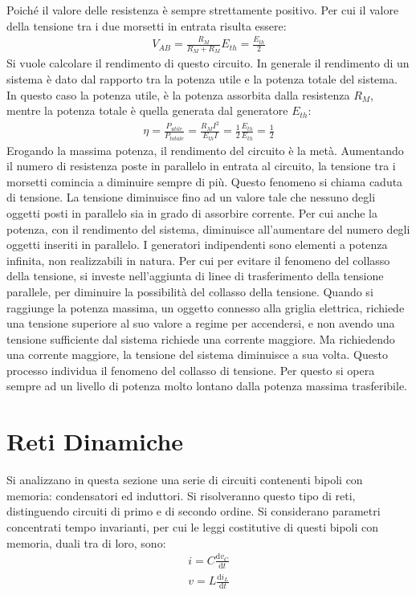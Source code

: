 \documentclass{article}
\newcommand{\df}{\mathrm{d}}
\numberwithin{equation}{subsection}
\begin{document}
Poiché il valore delle resistenza è sempre strettamente positivo. Per cui il valore della tensione tra i due morsetti in entrata risulta essere:
\begin{gather*}
    V_{AB}=\displaystyle\frac{R_M}{R_M+R_M}E_{th}=\frac{E_{th}}{2}
\end{gather*}
Si vuole calcolare il rendimento di questo circuito. In generale il rendimento di un sistema è dato dal rapporto tra la potenza utile e la potenza totale del sistema. In questo 
caso la potenza utile, è la potenza assorbita dalla resistenza $R_M$, mentre la potenza totale è quella generata dal generatore $E_{th}$:
\begin{gather*}
    \eta=\displaystyle\frac{P_{utile}}{P_{totale}}=\frac{R_{M}I^2}{E_{th}I}=\frac{1}{2}\frac{E_{th}}{E_{th}}=\frac{1}{2}
\end{gather*}
Erogando la massima potenza, il rendimento del circuito è la metà. Aumentando il numero di resistenza poste in parallelo in entrata al circuito, la tensione tra i morsetti 
comincia a diminuire sempre di più. Questo fenomeno si chiama caduta di tensione. La tensione diminuisce fino ad un valore tale che nessuno degli oggetti posti in parallelo 
sia in grado di assorbire corrente. Per cui anche la potenza, con il rendimento del sistema, diminuisce all'aumentare del numero degli oggetti inseriti in parallelo. I 
generatori indipendenti sono elementi a potenza infinita, non realizzabili in natura. Per cui per evitare il fenomeno del collasso della tensione, si investe nell'aggiunta di 
linee di trasferimento della tensione parallele, per diminuire la possibilità del collasso della tensione. Quando si raggiunge la potenza massima, un oggetto connesso alla 
griglia elettrica, richiede una tensione superiore al suo valore a regime per accendersi, e non avendo una tensione sufficiente dal sistema richiede una corrente maggiore. 
Ma richiedendo una corrente maggiore, la tensione del sistema diminuisce a sua volta. Questo processo individua il fenomeno del collasso di tensione. Per questo si opera 
sempre ad un livello di potenza molto lontano dalla potenza massima trasferibile. 

\clearpage 

\section{Reti Dinamiche}

Si analizzano in questa sezione una serie di circuiti contenenti bipoli con memoria: condensatori ed induttori. Si risolveranno questo tipo di reti, distinguendo 
circuiti di primo e di secondo ordine. Si considerano parametri concentrati tempo invarianti, per cui le leggi costitutive di questi bipoli con memoria, duali tra di loro, sono:
\begin{gather*}
    i=\displaystyle C\frac{\df v_C}{\df t}\\
    v=\displaystyle L\frac{\df i_L}{\df t}
\end{gather*}
\end{document}

